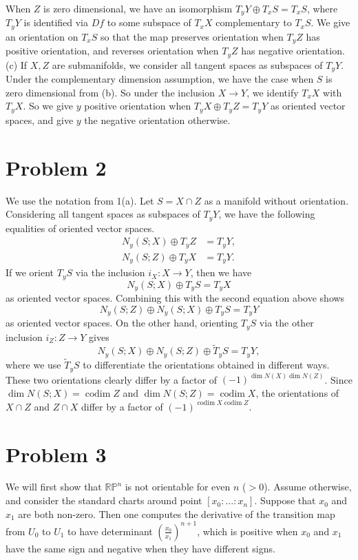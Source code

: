 \documentclass{amsart}
\numberwithin{equation}{section}
\theoremstyle{plain}
\theoremstyle{definition}
\theoremstyle{remark}
\renewcommand{\_}[2]{\underbrace{#1}_{#2}}
\renewcommand{\^}[2]{\overbrace{#1}_{#2}}
\newcommand{\R}{\mathbb{R}}
\renewcommand{\P}{\mathbb{P}}
\newcommand{\codim}{\operatorname{codim}}
\begin{document}
When $Z$ is zero dimensional, we have an isomorphism $T_yY \oplus T_xS = T_xS$, where $T_yY$ is identified via $Df$ to some subspace of $T_xX$ complementary to $T_xS$. We give an orientation on $T_xS$ so that the map preserves orientation when $T_yZ$ has positive orientation, and reverses orientation when $T_yZ$ has negative orientation.\\

(c) If $X,Z$ are submanifolds, we consider all tangent spaces as subspaces of $T_yY$. Under the complementary dimension assumption, we have the case when $S$ is zero dimensional from (b). So under the inclusion $X\to Y$, we identify $T_xX$ with $T_yX$. So we give $y$ positive orientation when $T_yX\oplus T_yZ = T_yY$ as oriented vector spaces, and give $y$ the negative orientation otherwise.

\section*{Problem 2}
We use the notation from 1(a). Let $S = X\cap Z$ as a manifold without orientation. Considering all tangent spaces as subspaces of $T_yY$, we have the following equalities of oriented vector spaces.
\begin{align*}
  N_y(S;X) \oplus T_yZ &= T_yY,\\
  N_y(S;Z) \oplus T_yX &= T_yY.
\end{align*}
If we orient $T_yS$ via the inclusion $i_X:X\to Y$, then we have \[N_y(S;X) \oplus T_yS = T_yX\] as oriented vector spaces. Combining this with the second equation above shows \[N_y(S;Z) \oplus N_y(S;X) \oplus T_yS = T_yY\] as oriented vector spaces. On the other hand, orienting $T_yS$ via the other inclusion $i_Z: Z\to Y$ gives \[N_y(S;X) \oplus N_y(S;Z) \oplus \tilde T_yS = T_yY,\] where we use $\tilde T_yS$ to differentiate the orientations obtained in different ways. These two orientations clearly differ by a factor of $(-1)^{\dim N(X) \dim N(Z)}$. Since $\dim N(S; X) = \codim Z$ and $\dim N(S;Z) = \codim X$, the orientations of $X\cap Z$ and $Z\cap X$ differ by a factor of $(-1)^{\codim X \codim Z}$. 
\section*{Problem 3}

We will first show that $\R\P^n$ is not orientable for even $n$ ($>0$). Assume otherwise, and consider the standard charts around point $[x_0:\dots:x_n]$. Suppose that $x_0$ and $x_1$ are both non-zero. Then one computes the derivative of the transition map from $U_0$ to $U_1$ to have determinant $\left(\frac{x_0}{x_1}\right)^{n+1}$, which is positive when $x_0$ and $x_1$ have the same sign and negative when they have different signs.
\end{document}
